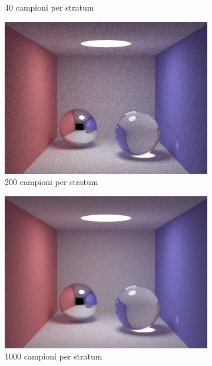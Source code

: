 \begin{figure}[p]
\begin{subfigure}[c]{0.4\linewidth}
	\caption{40 campioni per stratum}
    \end{subfigure}\hfill
    \begin{subfigure}[c]{0.4\linewidth}
	\includegraphics[width=\linewidth]{../assets/appendixD_result_200.png}
	\caption{200 campioni per stratum}
    \end{subfigure}\hfill
    \begin{subfigure}[c]{0.4\linewidth}
	\centering
	\includegraphics[width=\linewidth]{../assets/appendixD_result_1000.png}
	\caption{1000 campioni per stratum}
    \end{subfigure}\hfill
    \begin{subfigure}[c]{0.4\linewidth}
	\centering

\end{subfigure}
\end{figure}
